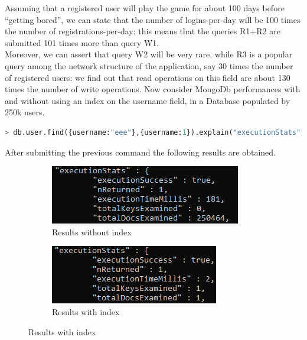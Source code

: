 Assuming that a registered user will play the game for about 100 days before “getting bored”, we can state that the number of logins-per-day will be 100 times the number of registrations-per-day: this means that the queries R1+R2 are submitted 101 times more than query W1.\\
Moreover, we can assert that query W2 will be very rare, while R3 is a popular query among the network structure of the application, say 30 times the number of registered users: we find out that read operations on this field are about 130 times the number of write operations.
Now consider MongoDb performances with and without using an index on the username field, in a Database populated by 250k users.

\begin{lstlisting}[language=python]
	> db.user.find({username:"eee"},{username:1}).explain("executionStats")
\end{lstlisting}

After submitting the previous command the following results are obtained.

\begin{figure}[H]
	
	\begin{subfigure}{0.5\textwidth}
		\includegraphics[width=0.9\linewidth]{img/UsernameNoIndex.png} 
		\caption{Results without index}
	\end{subfigure}
	\begin{subfigure}{0.5\textwidth}
		\includegraphics[width=0.9\linewidth]{img/UsernameIndex.png}
		\caption{Results with index}
	\end{subfigure}
\end{figure}

